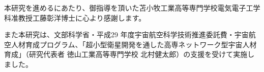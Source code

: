 \begin{acknowledgement}\label{acknowledgement}


本研究を進めるにあたり、御指導を頂いた苫小牧工業高等専門学校電気電子工学科准教授工藤彰洋博士に心より感謝します。

また本研究は、文部科学省・平成29
年度宇宙航空科学技術推進委託費・宇宙航空人材育成プログラム、「超小型衛星開発を通した高専ネットワーク型宇宙人材育成」（研究代表者
徳山工業高等専門学校 北村健太郎）の支援を受けて実施しました。

\end{acknowledgement}